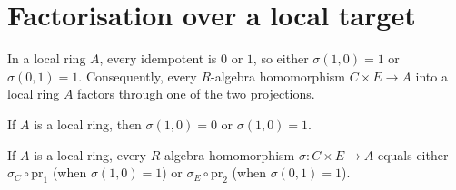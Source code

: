 \section{Factorisation over a local target}

In a local ring $A$, every idempotent is $0$ or $1$, so either
$\sigma(1, 0) = 1$ or $\sigma(0, 1) = 1$. Consequently, every $R$-algebra
homomorphism $C \times E \to A$ into a local ring $A$ factors through one of
the two projections.

\begin{lemma}
  \label{lem:apply-inl-zero-or-one}
  \leanok
  If $A$ is a local ring, then $\sigma(1, 0) = 0$ or $\sigma(1, 0) = 1$.
\end{lemma}

\begin{lemma}
  \label{lem:section-of-isLocalRing}
  \leanok
  If $A$ is a local ring, every $R$-algebra homomorphism $\sigma : C \times E
  \to A$ equals either $\sigma_C \circ \mathrm{pr}_1$ (when $\sigma(1, 0) = 1$)
  or $\sigma_E \circ \mathrm{pr}_2$ (when $\sigma(0, 1) = 1$).
\end{lemma}
